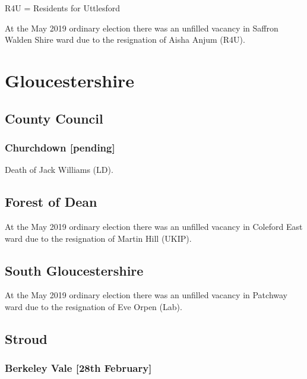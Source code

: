 \documentclass[a4paper,openany]{book}
\begin{document}
\begin{resultsiii}
R4U = Residents for Uttlesford

At the May 2019 ordinary election there was an unfilled vacancy in Saffron Walden Shire ward due to the resignation of Aisha Anjum (R4U).

\section{Gloucestershire}

\subsection*{County Council}

\subsubsection*{Churchdown \hspace*{\fill}\nolinebreak[1]%
	\enspace\hspace*{\fill}
	[pending]}


Death of Jack Williams (LD).

\subsection*{Forest of Dean}

At the May 2019 ordinary election there was an unfilled vacancy in Coleford East ward due to the resignation of Martin Hill (UKIP).

\subsection*{South Gloucestershire}

At the May 2019 ordinary election there was an unfilled vacancy in Patchway ward due to the resignation of Eve Orpen (Lab).

\subsection*{Stroud}

\subsubsection*{Berkeley Vale \hspace*{\fill}\nolinebreak[1]%
	\enspace\hspace*{\fill}
	[28th February]}


\end{resultsiii}
\end{document}
